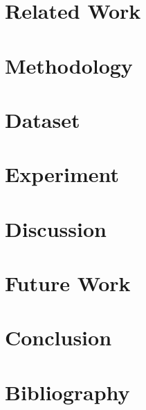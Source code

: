 \documentclass[
]{uob-thesis}
\begin{document}
\chapter{Related Work}

  

\chapter{Methodology}

  

\chapter{Dataset}

  

\chapter{Experiment}

  

\chapter{Discussion}

  

\chapter{Future Work}

  

\chapter{Conclusion}

  



\backmatter

\chapter*{Bibliography}

\printbibliography[heading=none]
\end{document}

